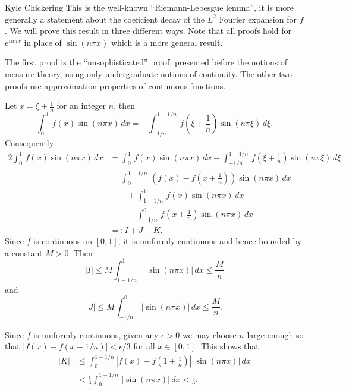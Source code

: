 

\begin{solution}{Kyle Chickering}
        This is the well-known ``Riemann-Lebesgue lemma'', it is more generally a statement about the coeficient decay of the $L^2$ Fourier expansion for $f$.
        We will prove this result in three different ways.
        Note that all proofs hold for $e^{i n\pi x}$ in place of $\sin(n\pi x)$ which is a more general result.

        The first proof is the ``unsophisticated'' proof, presented before the notions of measure theory, using only undergraduate notions of continuity.
        The other two proofs use approximation properties of continuous functions.

	Let $x = \xi + \frac{1}{n}$ for an integer $n$, then
    \[ \int_0^1\,f(x)\sin(n\pi x)\,dx = -\int_{-1/n}^{1-1/n}\,f\left(\xi + \frac{1}{n}\right)\sin(n\pi \xi)\,d\xi. \]
	Consequently
	\begin{align*}
		2\int_0^1\,f(x)\sin(n\pi x)\,dx &= \int_0^1\,f(x)\sin(n\pi x)\,dx - \int_{-1/n}^{1-1/n}\,f\left(\xi + \frac{1}{n}\right)\sin(n\pi \xi)\,d\xi \\
                                        &= \int_{0}^{1-1/n}\,(f(x)-f\left(x+\frac{1}{n}\right))\sin(n\pi x)\,dx \\ &\qquad + \int_{1-1/n}^1\,f(x)\sin(n\pi x)\,dx \\
                                        &\qquad - \int_{-1/n}^0\,f\left(x+\frac{1}{n}\right)\sin(n\pi x)\,dx \\
                                        &=: I + J - K.
	\end{align*}
	Since $f$ is continuous on $[0,1]$, it is uniformly continuous and hence bounded by a constant $M>0$.
    Then
    \[ |I| \leqslant M\int_{1-1/n}^1\,|\sin(n\pi x)|\,dx \leqslant \frac{M}{n} \]
	and
    \[ |J| \leqslant M \int_{-1/n}^0\,|\sin(n\pi x)|\,dx \leqslant \frac{M}{n}. \]

	Since $f$ is uniformly continuous, given any $\epsilon>0$ we may choose $n$ large enough so that $|f(x)-f(x+1/n)|<\epsilon/3$ for all $x\in [0,1]$.
    This shows that
	\begin{align*}
		|K| &\leqslant \int_0^{1-1/n}|f(x)-f\left(1+\frac{1}{n}\right)||\sin(n\pi x)|\,dx \\
            &< \frac{\epsilon}{3}\int_0^{1-1/n}\,|\sin(n\pi x)|\,dx < \frac{\epsilon}{3}.
	\end{align*}


\end{solution}
